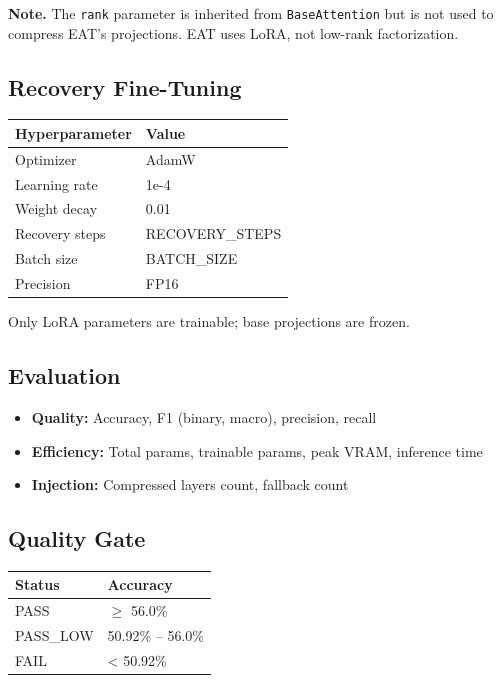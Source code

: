 \textbf{Note.} The \texttt{rank} parameter is inherited from \texttt{BaseAttention} but is not 
used to compress EAT's projections. EAT uses LoRA, not low-rank factorization.

\subsection{Recovery Fine-Tuning}

\begin{table}[H]
\centering
\small
\begin{tabular}{ll}
\toprule
\textbf{Hyperparameter} & \textbf{Value} \\
\midrule
Optimizer & AdamW \\
Learning rate & 1e-4 \\
Weight decay & 0.01 \\
Recovery steps & {{RECOVERY\_STEPS}} \\
Batch size & {{BATCH\_SIZE}} \\
Precision & FP16 \\
\bottomrule
\end{tabular}
\end{table}

Only LoRA parameters are trainable; base projections are frozen.

\subsection{Evaluation}

\begin{itemize}
\item \textbf{Quality:} Accuracy, F1 (binary, macro), precision, recall
\item \textbf{Efficiency:} Total params, trainable params, peak VRAM, inference time
\item \textbf{Injection:} Compressed layers count, fallback count

\end{itemize}
\subsection{Quality Gate}

\begin{table}[H]
\centering
\small
\begin{tabular}{ll}
\toprule
\textbf{Status} & \textbf{Accuracy} \\
\midrule
PASS & $\ge$ 56.0\% \\
PASS\_LOW & 50.92\% -- 56.0\% \\
FAIL & < 50.92\% \\
\bottomrule
\end{tabular}
\end{table}

